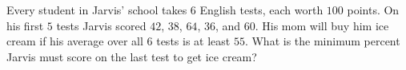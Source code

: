 Every student in Jarvis' school takes $6$ English tests, each worth $100$ points. On his first $5$ tests Jarvis scored $42$, $38$, $64$, $36$, and $60$. His mom will buy him ice cream if his average over all $6$ tests is at least $55$. What is the minimum percent Jarvis must score on the last test to get ice cream?
